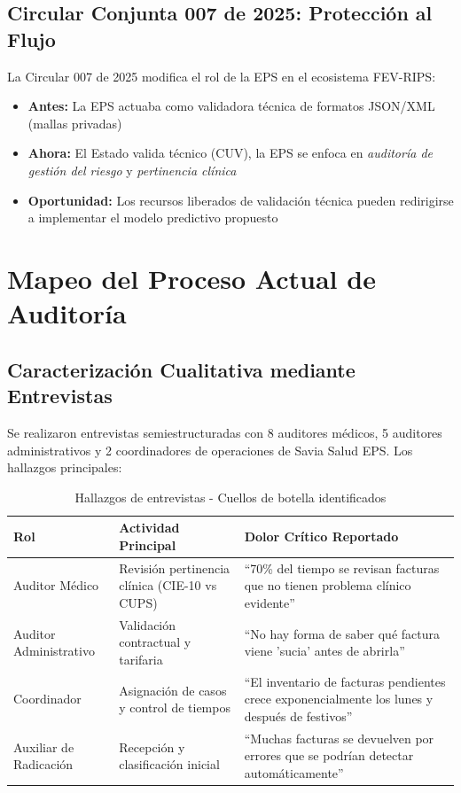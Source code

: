 \documentclass[12pt,letterpaper]{report}
\begin{document}
\subsection{Circular Conjunta 007 de 2025: Protección al Flujo}

La Circular 007 de 2025 modifica el rol de la EPS en el ecosistema FEV-RIPS:

\begin{marcolegal}
\begin{itemize}
    \item \textbf{Antes:} La EPS actuaba como validadora técnica de formatos JSON/XML (mallas privadas)
    \item \textbf{Ahora:} El Estado valida técnico (CUV), la EPS se enfoca en \textit{auditoría de gestión del riesgo} y \textit{pertinencia clínica}
    \item \textbf{Oportunidad:} Los recursos liberados de validación técnica pueden redirigirse a implementar el modelo predictivo propuesto
\end{itemize}
\end{marcolegal}

\section{Mapeo del Proceso Actual de Auditoría}

\subsection{Caracterización Cualitativa mediante Entrevistas}

Se realizaron entrevistas semiestructuradas con 8 auditores médicos, 5 auditores administrativos y 2 coordinadores de operaciones de Savia Salud EPS. Los hallazgos principales:

\begin{table}[H]
\centering
\caption{Hallazgos de entrevistas - Cuellos de botella identificados}
\begin{tabular}{@{}p{3cm}p{4cm}p{6cm}@{}}
\toprule
\textbf{Rol} & \textbf{Actividad Principal} & \textbf{Dolor Crítico Reportado} \\
\midrule
Auditor Médico & Revisión pertinencia clínica (CIE-10 vs CUPS) & ``70\% del tiempo se revisan facturas que no tienen problema clínico evidente'' \\
Auditor Administrativo & Validación contractual y tarifaria & ``No hay forma de saber qué factura viene 'sucia' antes de abrirla'' \\
Coordinador & Asignación de casos y control de tiempos & ``El inventario de facturas pendientes crece exponencialmente los lunes y después de festivos'' \\
Auxiliar de Radicación & Recepción y clasificación inicial & ``Muchas facturas se devuelven por errores que se podrían detectar automáticamente'' \\
\bottomrule
\end{tabular}
\end{table}
\end{document}

